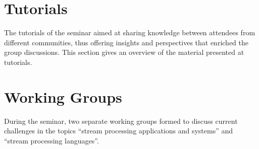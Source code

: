 \documentclass[preprint]{sig-alternate-10pt}
\begin{document}

\section{Tutorials}
The tutorials of the seminar aimed at sharing knowledge between
attendees from different communities, thus offering insights and
perspectives that enriched the group discussions. This section gives
an overview of the material presented at tutorials.




\section{Working Groups}
During the seminar, two separate working groups formed to discuss
current challenges in the topics ``stream processing applications and systems''
and ``stream processing languages''.






\balance

\end{document}
